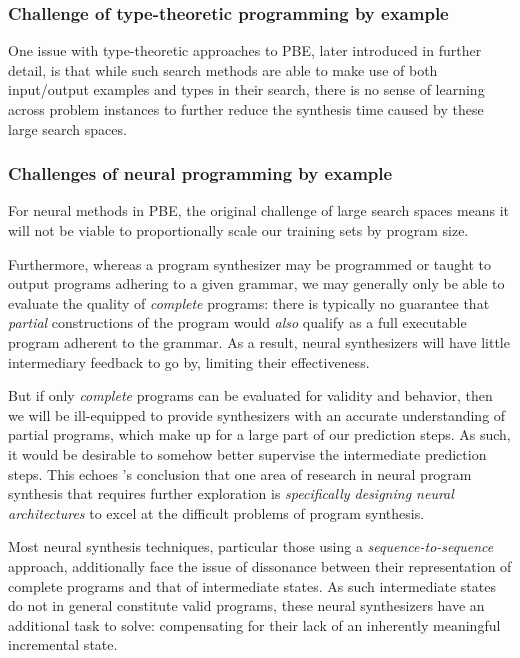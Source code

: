 \documentclass{article}
\begin{document}
\subsubsection{Challenge of type-theoretic programming by example} \label{sec:typepbe}

One issue with type-theoretic approaches to PBE, later introduced in further detail,
is that while such search methods are able to make use of both input/output examples and types in their search,
there is no sense of learning across problem instances to further reduce the synthesis time caused by these large search spaces.

\subsubsection{Challenges of neural programming by example} \label{sec:challengesnps}

For neural methods in PBE, the original challenge of large search spaces means
it will not be viable to proportionally scale our training sets by program size.

Furthermore, whereas a program synthesizer may be programmed or taught to output programs adhering to a given grammar,
we may generally only be able to evaluate the quality of \emph{complete} programs:
there is typically no guarantee that \emph{partial} constructions of the program would \emph{also} qualify as a full executable program adherent to the grammar.
As a result, neural synthesizers will have little intermediary feedback to go by, limiting their effectiveness.

But if only \emph{complete} programs can be evaluated for validity and behavior, then 
we will be ill-equipped to provide synthesizers with an accurate understanding of partial programs,
which make up for a large part of our prediction steps.
As such, it would be desirable to somehow better supervise the intermediate prediction steps.
This echoes \citet{nps}'s conclusion that one area of research in neural program synthesis that requires further exploration is
\emph{specifically designing neural architectures} to excel at the difficult problems of program synthesis.


Most neural synthesis techniques, particular those using a \emph{sequence-to-sequence} approach,
additionally face the issue of dissonance between their representation of complete programs and that of intermediate states.
As such intermediate states do not in general constitute valid programs,
these neural synthesizers have an additional task to solve:
compensating for their lack of an inherently meaningful incremental state.
\end{document}

